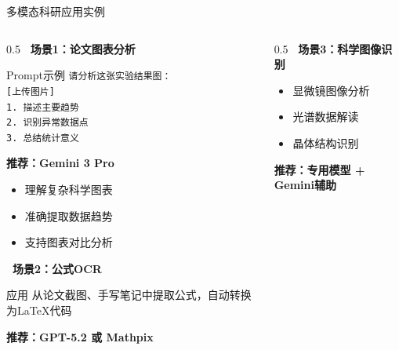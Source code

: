 \documentclass[aspectratio=169,11pt]{beamer}
\begin{document}
\begin{frame}{多模态科研应用实例}
    \begin{columns}
        \begin{column}{0.5\textwidth}
            \textbf{\faChartBar\ 场景1：论文图表分析}
            \begin{exampleblock}{Prompt示例}
                \scriptsize
                \texttt{请分析这张实验结果图：}\\
                \texttt{[上传图片]}\\
                \texttt{1. 描述主要趋势}\\
                \texttt{2. 识别异常数据点}\\
                \texttt{3. 总结统计意义}
            \end{exampleblock}
            
            \textbf{推荐：Gemini 3 Pro}
            \begin{itemize}
                \item 理解复杂科学图表
                \item 准确提取数据趋势
                \item 支持图表对比分析
            \end{itemize}
            
            \vspace{0.3cm}
            \textbf{\faSuperscript\ 场景2：公式OCR}
            \begin{exampleblock}{应用}
                \scriptsize
                从论文截图、手写笔记中提取公式，自动转换为LaTeX代码
            \end{exampleblock}
            
            \textbf{推荐：GPT-5.2 或 Mathpix}
        \end{column}
        \begin{column}{0.5\textwidth}
            \textbf{\faMicroscope\ 场景3：科学图像识别}
            \begin{itemize}
                \item 显微镜图像分析
                \item 光谱数据解读
                \item 晶体结构识别
            \end{itemize}
            
            \textbf{推荐：专用模型 + Gemini辅助}
            

\end{column}
\end{columns}
\end{frame}
\end{document}
